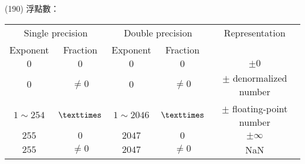 \item \begin{theorem}{(190)} 浮點數：
    \begin{table}[H]
        \centering
        \begin{tabular}{|c|c|c|c|c|}
            \hline
            \multicolumn{2}{|c|}{Single precision} & \multicolumn{2}{c|}{Double precision} & Representation \\
            \Xhline{2\arrayrulewidth}
            Exponent & Fraction & Exponent & Fraction & \\
            \hline
            $0$ & $0$ & $0$ & $0$ & $\pm 0$ \\
            \hline
            $0$ & $\neq 0$ & $0$ & $\neq 0$ & $\pm$ denormalized number \\
            \hline
            $1 \sim 254$ & $\texttimes$ & $1 \sim 2046$ & $\texttimes$ & $\pm$ floating-point number \\
            \hline
            $255$ & $0$ & $2047$ & $0$ & $\pm \infty$ \\
            \hline
            $255$ & $\neq 0$ & $2047$ & $\neq 0$ & NaN \\
            \hline
        \end{tabular}
    \end{table}
\end{theorem}
